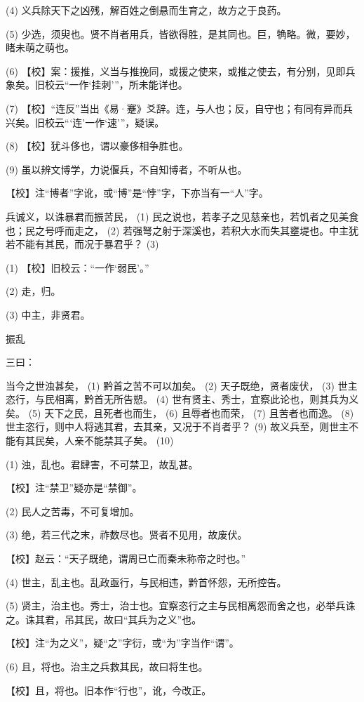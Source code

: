 \documentclass[12pt,UTF8]{ctexbook}
\begin{document}
(4) 义兵除天下之凶残，解百姓之倒悬而生育之，故方之于良药。

(5) 少选，须臾也。贤不肖者用兵，皆欲得胜，是其同也。巨，觕略。微，要妙，睹未萌之萌也。

(6) 【校】案：援推，义当与推挽同，或援之使来，或推之使去，有分别，见即兵象矣。旧校云“一作‘挂刺’”，所未能详也。

(7) 【校】“连反”当出《易·蹇》爻辞。连，与人也；反，自守也；有同有异而兵兴矣。旧校云“‘连’一作‘速’”，疑误。

(8) 【校】犹斗侈也，谓以豪侈相争胜也。

(9) 虽以辨文博学，力说偃兵，不自知博者，不听从也。

【校】注“博者”字讹，或“博”是“悖”字，下亦当有一“人”字。

兵诚义，以诛暴君而振苦民， (1) 民之说也，若孝子之见慈亲也，若饥者之见美食也；民之号呼而走之， (2) 若强弩之射于深溪也，若积大水而失其壅堤也。中主犹若不能有其民，而况于暴君乎？ (3)

(1) 【校】旧校云：“一作‘弱民’。”

(2) 走，归。

(3) 中主，非贤君。





振乱


三曰：

当今之世浊甚矣， (1) 黔首之苦不可以加矣。 (2) 天子既绝，贤者废伏， (3) 世主恣行，与民相离，黔首无所告愬。 (4) 世有贤主、秀士，宜察此论也，则其兵为义矣。 (5) 天下之民，且死者也而生， (6) 且辱者也而荣， (7) 且苦者也而逸。 (8) 世主恣行，则中人将逃其君，去其亲，又况于不肖者乎？ (9) 故义兵至，则世主不能有其民矣，人亲不能禁其子矣。 (10)

(1) 浊，乱也。君肆害，不可禁卫，故乱甚。

【校】注“禁卫”疑亦是“禁御”。

(2) 民人之苦毒，不可复增加。

(3) 绝，若三代之末，祚数尽也。贤者不见用，故废伏。

【校】赵云：“天子既绝，谓周已亡而秦未称帝之时也。”

(4) 世主，乱主也。乱政亟行，与民相违，黔首怀怨，无所控告。

(5) 贤主，治主也。秀士，治士也。宜察恣行之主与民相离怨而舍之也，必举兵诛之。诛其君，吊其民，故曰“其兵为之义”也。

【校】注“为之义”，疑“之”字衍，或“为”字当作“谓”。

(6) 且，将也。治主之兵救其民，故曰将生也。

【校】且，将也。旧本作“行也”，讹，今改正。
\end{document}
